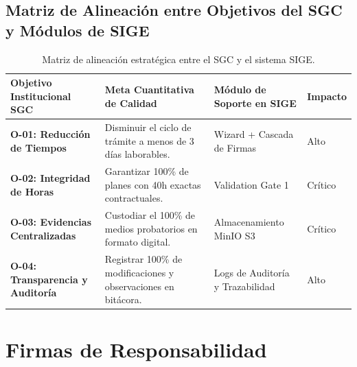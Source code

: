 \documentclass[12pt,a4paper]{article}
\begin{document}
\subsection{Matriz de Alineación entre Objetivos del SGC y Módulos de SIGE}
\begin{table}[H]
\centering
\small
\renewcommand{\arraystretch}{1.2}
\begin{tabularx}{\textwidth}{|>{\hsize=0.9\hsize\raggedright\arraybackslash\bfseries\footnotesize}X|>{\hsize=1.5\hsize\raggedright\arraybackslash\footnotesize}X|>{\hsize=1.0\hsize\raggedright\arraybackslash\footnotesize}X|>{\hsize=0.6\hsize\centering\arraybackslash\footnotesize}X|}
\hline
\rowcolor{tableheader}
\textbf{Objetivo Institucional SGC} & \textbf{Meta Cuantitativa de Calidad} & \textbf{Módulo de Soporte en SIGE} & \textbf{Impacto} \\
\hline
O-01: Reducción de Tiempos & Disminuir el ciclo de trámite a menos de 3 días laborables. & Wizard + Cascada de Firmas & Alto \\
\hline
O-02: Integridad de Horas & Garantizar 100\% de planes con 40h exactas contractuales. & Validation Gate 1 & Crítico \\
\hline
O-03: Evidencias Centralizadas & Custodiar el 100\% de medios probatorios en formato digital. & Almacenamiento MinIO S3 & Crítico \\
\hline
O-04: Transparencia y Auditoría & Registrar 100\% de modificaciones y observaciones en bitácora. & Logs de Auditoría y Trazabilidad & Alto \\
\hline
\end{tabularx}
\caption{Matriz de alineación estratégica entre el SGC y el sistema SIGE.}
\label{tab:sgc_alignment}
\end{table}

\section{Firmas de Responsabilidad}
\end{document}

